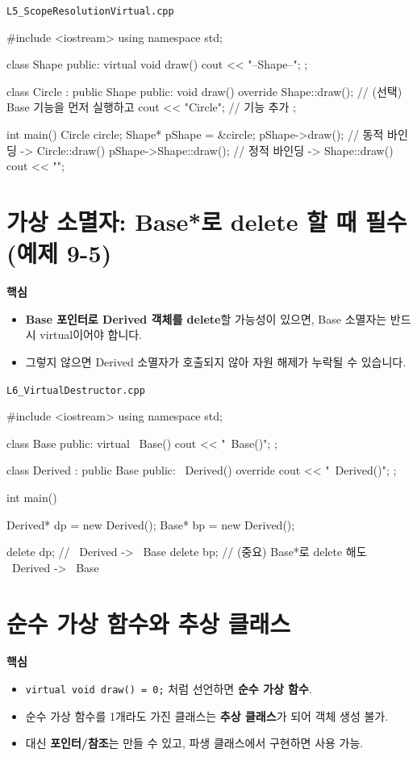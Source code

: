 \documentclass[11pt,a4paper]{article}
\newcommand{\filetag}[1]{\texttt{\color{Accent}#1}}
\begin{document}
\noindent\filetag{L5\_ScopeResolutionVirtual.cpp}
\begin{cppcode}
#include <iostream>
using namespace std;

class Shape {
public:
    virtual void draw() { cout << "--Shape--"; }
};

class Circle : public Shape {
public:
    void draw() override {
        Shape::draw();     // (선택) Base 기능을 먼저 실행하고
        cout << "Circle\n"; // 기능 추가
    }
};

int main() {
    Circle circle;
    Shape* pShape = &circle;
    pShape->draw();           // 동적 바인딩 -> Circle::draw()
    pShape->Shape::draw();    // 정적 바인딩 -> Shape::draw()
    cout << "\n";
}
\end{cppcode}

\section{가상 소멸자: Base*로 delete 할 때 필수 (예제 9-5)}
\begin{GoalBox}
\textbf{핵심}
\begin{itemize}[leftmargin=18pt]
  \item \textbf{Base 포인터로 Derived 객체를 delete}할 가능성이 있으면, Base 소멸자는 반드시 virtual이어야 합니다.
  \item 그렇지 않으면 Derived 소멸자가 호출되지 않아 자원 해제가 누락될 수 있습니다.
\end{itemize}
\end{GoalBox}

\noindent\filetag{L6\_VirtualDestructor.cpp}
\begin{cppcode}
#include <iostream>
using namespace std;

class Base {
public:
    virtual ~Base() { cout << "~Base()\n"; }
};

class Derived : public Base {
public:
    ~Derived() override { cout << "~Derived()\n"; }
};

int main() {
    Derived* dp = new Derived();
    Base* bp = new Derived();

    delete dp; // ~Derived -> ~Base
    delete bp; // (중요) Base*로 delete 해도 ~Derived -> ~Base
}
\end{cppcode}

\section{순수 가상 함수와 추상 클래스}
\begin{GoalBox}
\textbf{핵심}
\begin{itemize}[leftmargin=18pt]
  \item \texttt{virtual void draw() = 0;} 처럼 선언하면 \textbf{순수 가상 함수}.
  \item 순수 가상 함수를 1개라도 가진 클래스는 \textbf{추상 클래스}가 되어 객체 생성 불가.
  \item 대신 \textbf{포인터/참조}는 만들 수 있고, 파생 클래스에서 구현하면 사용 가능.
\end{itemize}
\end{GoalBox}
\end{document}
